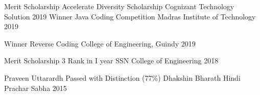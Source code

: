 



\begin{cvhonors}

 \cvhonor  
{Merit Scholarship} %
    {Accelerate Diversity Scholarship} %
    {Cognizant Technology Solution} %
    {2019} %
  \cvhonor
    {Winner} %
    {Java Coding Competition} %
    {Madras Institute of Technology} %
    {2019} %

  \cvhonor
    {Winner} %
    {Reverse Coding} %
    {College of Engineering, Guindy} %
    {2019} %

  \cvhonor
    {Merit Scholarship} %
    {3 Rank in I year} %
    {SSN College of Engineering} %
    {2018} %
 
 

  \cvhonor
    {Praveen Uttarardh} %
    {Passed with Distinction (77\%)} %
    {Dhakshin Bharath Hindi Prachar Sabha} %
    {2015} %

\end{cvhonors}
